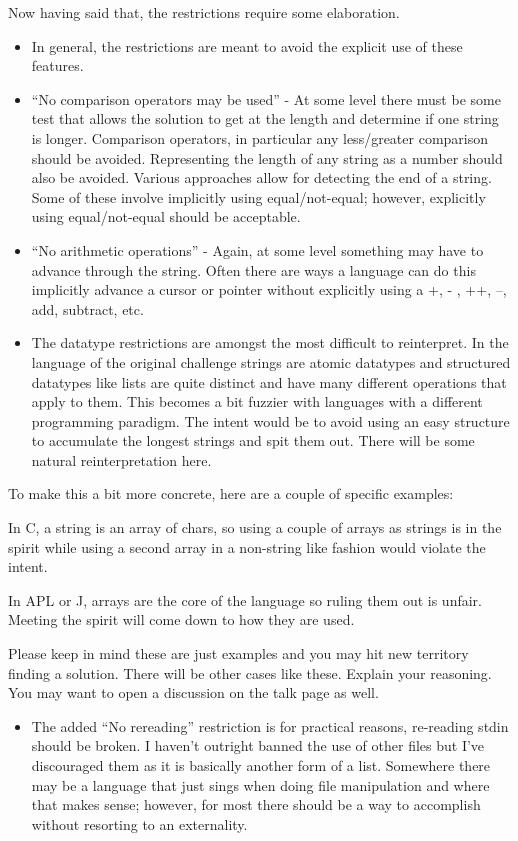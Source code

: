 \begin{itemize}
Now having said that, the restrictions require some elaboration.

\begin{itemize}
\item
  In general, the restrictions are meant to avoid the explicit use of
  these features.
\item
  ``No comparison operators may be used'' - At some level there must be
  some test that allows the solution to get at the length and determine
  if one string is longer. Comparison operators, in particular any
  less/greater comparison should be avoided. Representing the length of
  any string as a number should also be avoided. Various approaches
  allow for detecting the end of a string. Some of these involve
  implicitly using equal/not-equal; however, explicitly using
  equal/not-equal should be acceptable.
\item
  ``No arithmetic operations'' - Again, at some level something may have
  to advance through the string. Often there are ways a language can do
  this implicitly advance a cursor or pointer without explicitly using a
  +, - , ++, --, add, subtract, etc.
\item
  The datatype restrictions are amongst the most difficult to
  reinterpret. In the language of the original challenge strings are
  atomic datatypes and structured datatypes like lists are quite
  distinct and have many different operations that apply to them. This
  becomes a bit fuzzier with languages with a different programming
  paradigm. The intent would be to avoid using an easy structure to
  accumulate the longest strings and spit them out. There will be some
  natural reinterpretation here.
\end{itemize}

To make this a bit more concrete, here are a couple of specific
examples:

In C, a string is an array of chars, so using a couple of arrays as
strings is in the spirit while using a second array in a non-string like
fashion would violate the intent.

In APL or J, arrays are the core of the language so ruling them out is
unfair. Meeting the spirit will come down to how they are used.

Please keep in mind these are just examples and you may hit new
territory finding a solution. There will be other cases like these.
Explain your reasoning. You may want to open a discussion on the talk
page as well.

\begin{itemize}
\item
  The added ``No rereading'' restriction is for practical reasons,
  re-reading stdin should be broken. I haven't outright banned the use
  of other files but I've discouraged them as it is basically another
  form of a list. Somewhere there may be a language that just sings when
  doing file manipulation and where that makes sense; however, for most
  there should be a way to accomplish without resorting to an
  externality.
\end{itemize}


\end{itemize}
